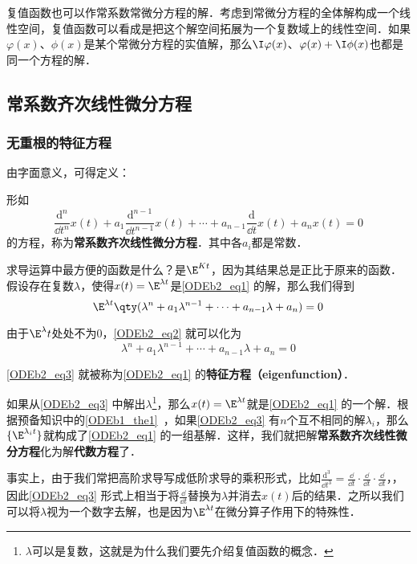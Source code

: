 复值函数也可以作常系数常微分方程的解．考虑到常微分方程的全体解构成一个线性空间，复值函数可以看成是把这个解空间拓展为一个复数域上的线性空间．如果$\varphi(x)$、$\phi(x)$是某个常微分方程的实值解，那么$\I\varphi(x)$、$\varphi(x)+\I \phi(x)$也都是同一个方程的解．


\subsection{常系数齐次线性微分方程}

\subsubsection{无重根的特征方程}

由字面意义，可得定义：
\begin{definition}{}
形如
\begin{equation}\label{ODEb2_eq1}
\frac{\mathrm{d}^n}{\dd t^n}x(t)+a_1\frac{\mathrm{d}^{n-1}}{\dd t^{n-1}}x(t)+\cdots+a_{n-1}\frac{\mathrm{d}}{\dd t}x(t)+a_nx(t)=0
\end{equation}
的方程，称为\textbf{常系数齐次线性微分方程}．其中各$a_i$都是常数．
\end{definition}

求导运算中最方便的函数是什么？是$\E^{Kt}$，因为其结果总是正比于原来的函数．假设存在复数$\lambda$，使得$x(t)=\E^{\lambda t}$是\autoref{ODEb2_eq1} 的解，那么我们得到
\begin{equation}\label{ODEb2_eq2}
\E^{\lambda t}\qty(\lambda^n+a_1\lambda^{n-1}+\cdots+a_{n-1}\lambda+a_n)=0
\end{equation}

由于$\E^\lambda t$处处不为$0$，\autoref{ODEb2_eq2} 就可以化为
\begin{equation}\label{ODEb2_eq3}
\lambda^n+a_1\lambda^{n-1}+\cdots+a_{n-1}\lambda+a_n=0
\end{equation}

\autoref{ODEb2_eq3} 就被称为\autoref{ODEb2_eq1} 的\textbf{特征方程（eigenfunction）}．

如果从\autoref{ODEb2_eq3} 中解出$\lambda$\footnote{$\lambda$可以是复数，这就是为什么我们要先介绍复值函数的概念．}，那么$x(t)=\E^{\lambda t}$就是\autoref{ODEb2_eq1} 的一个解．根据预备知识中的\autoref{ODEb1_the1}~，如果\autoref{ODEb2_eq3} 有$n$个互不相同的解$\lambda_i$，那么$\{\E^{\lambda_i t}\}$就构成了\autoref{ODEb2_eq1} 的一组基解．这样，我们就把解\textbf{常系数齐次线性微分方程}化为解\textbf{代数方程}了．


事实上，由于我们常把高阶求导写成低阶求导的乘积形式，比如$\frac{\mathrm{d}^3}{\dd t^3}=\frac{\dd }{\dd t}\cdot\frac{\dd }{\dd t}\cdot\frac{\dd }{\dd t}$，，因此\autoref{ODEb2_eq3} 形式上相当于将$\frac{\dd }{\dd t}$替换为$\lambda$并消去$x(t)$后的结果．之所以我们可以将$\lambda$视为一个数字去解，也是因为$\E^{\lambda t}$在微分算子作用下的特殊性．


